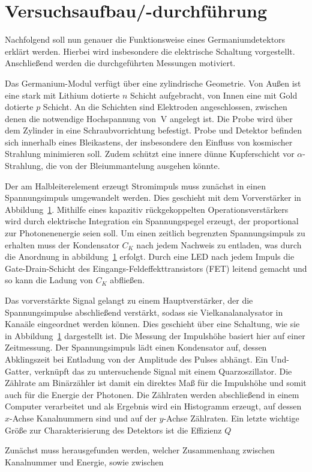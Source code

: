 \section{Versuchsaufbau/-durchführung}
Nachfolgend soll nun genauer die Funktionsweise eines Germaniumdetektors erklärt werden. Hierbei wird insbesondere 
die elektrische Schaltung vorgestellt. Anschließend werden die durchgeführten Messungen motiviert.

Das Germanium-Modul verfügt über eine zylindrische Geometrie. Von Außen ist eine stark mit Lithium dotierte $n$
Schicht aufgebracht, von Innen eine mit Gold dotierte $p$ Schicht. An die Schichten sind Elektroden angeschlossen, zwischen denen 
die notwendige Hochspannung von $\SI{}{\volt}$ angelegt ist. Die Probe wird über dem Zylinder in eine Schraubvorrichtung 
befestigt. Probe und Detektor befinden sich innerhalb eines Bleikastens, der insbesondere den Einfluss von kosmischer 
Strahlung minimieren soll. Zudem schützt eine innere dünne Kupferschicht vor $\alpha$-Strahlung, die von der Bleiummantelung ausgehen 
könnte. 

Der am Halbleiterelement erzeugt Stromimpuls muss zunächst in einen Spannungsimpuls umgewandelt werden. Dies geschieht mit 
dem Vorverstärker in Abbildung~\ref{}. Mithilfe eines kapazitiv rückgekoppelten Operationsverstärkers wird durch elektrische 
Integration ein Spannungspegel erzeugt, der proportional zur Photonenenergie seien soll. Um einen zeitlich 
begrenzten Spannungsimpuls zu erhalten muss der Kondensator $C_K$ nach jedem Nachweis zu entladen, was durch die 
Anordnung in abbildung~\ref{} erfolgt. Durch eine LED nach jedem Impuls die Gate-Drain-Schicht des 
Eingangs-Feldeffekttransistors (FET) leitend gemacht und so kann die Ladung von $C_K$ abfließen.

Das vorverstärkte Signal gelangt zu einem Hauptverstärker, der die Spannungsimpulse abschließend verstärkt, sodass 
sie Vielkanalanalysator in Kanaäle eingeordnet werden können. Dies geschieht über eine Schaltung, wie sie in Abbildung~\ref{}
dargestellt ist. Die Messung der Impulshöhe basiert hier auf einer Zeitmessung. Der Spannungsimpuls lädt einen 
Kondensator auf, dessen Abklingszeit bei Entladung von der Amplitude des Pulses abhängt. Ein Und-Gatter, verknüpft 
das zu untersuchende Signal mit einem Quarzoszillator. Die Zählrate am Binärzähler ist damit ein direktes Maß für 
die Impulshöhe und somit auch für die Energie der Photonen. 
Die Zählraten werden abschließend in einem Computer verarbeitet und als Ergebnis wird ein Histogramm erzeugt, auf dessen 
$x$-Achse Kanalnummern sind und auf der $y$-Achse Zählraten. Ein letzte wichtige Größe zur Charakterisierung des Detektors ist 
die Effizienz $Q$

Zunächst muss herausgefunden werden, welcher Zusammenhang zwischen Kanalnummer und Energie, sowie zwischen 


